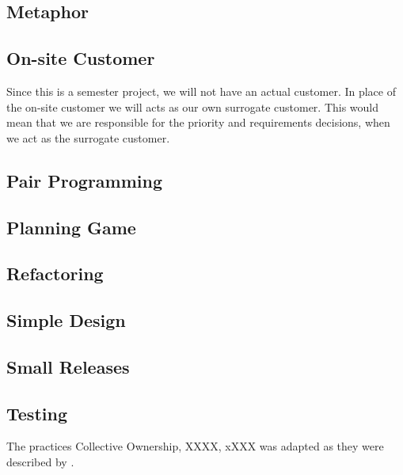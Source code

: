 \subsection{Metaphor}


\subsection{On-site Customer}
Since this is a semester project, we will not have an actual customer.
In place of the on-site customer we will acts as our own surrogate customer.
This would mean that we are responsible for the priority and requirements decisions, when we act as the surrogate customer.

\subsection{Pair Programming}


\subsection{Planning Game}


\subsection{Refactoring}


\subsection{Simple Design}


\subsection{Small Releases}


\subsection{Testing}




The practices 
Collective Ownership, 
XXXX, 
xXXX
was adapted as they were described by \cite{Beck}.